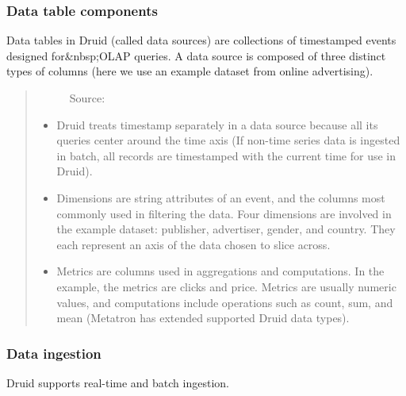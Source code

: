 \documentclass[letterpaper,10pt,english]{sphinxmanual}
\begin{document}
\subsubsection{Data table components}
\label{\detokenize{discovery/part01/druid_features:id1}}
Data tables in Druid (called data sources) are collections of timestamped events designed for\&nbsp;OLAP queries. A data source is composed of three distinct types of columns (here we use an example dataset from online advertising).
\begin{quote}

\begin{figure}[H]
\centering
\capstart

\noindent{}
\caption{Source: }\label{\detokenize{discovery/part01/druid_features:id6}}\end{figure}
\begin{itemize}
\item {} 
 Druid treats timestamp separately in a data source because all its queries center around the time axis (If non-time series data is ingested in batch, all records are timestamped with the current time for use in Druid).

\item {} 
 Dimensions are string attributes of an event, and the columns most commonly used in filtering the data. Four dimensions are involved in the example dataset: publisher, advertiser, gender, and country. They each represent an axis of the data chosen to slice across.

\item {} 
 Metrics are columns used in aggregations and computations. In the example, the metrics are clicks and price. Metrics are usually numeric values, and computations include operations such as count, sum, and mean (Metatron has extended supported Druid data types).

\end{itemize}
\end{quote}


\subsubsection{Data ingestion}
\label{\detokenize{discovery/part01/druid_features:ingestion}}
Druid supports real-time and batch ingestion.
\end{document}
